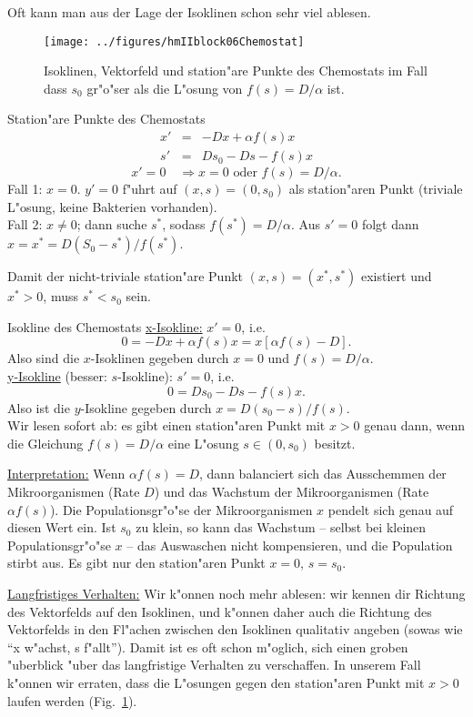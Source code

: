 Oft kann man aus der Lage der Isoklinen schon sehr viel ablesen. 

\begin{figure}[htb]
\begin{center}
\texttt{[image: ../figures/hmIIblock06Chemostat]}
\end{center}
\caption{Isoklinen, Vektorfeld und station"are Punkte 
des Chemostats im Fall dass 
$s_0$ gr"o"ser als die L"osung von $f(s)=D/\alpha$ ist.}
\label{chemostat}
\end{figure}
\begin{bspX} Station"are Punkte des Chemostats\\
\begin{eqnarray*}
x' & = & -Dx+\alpha f(s) x\\
s' & = & Ds_0 - Ds - f(s) x
\end{eqnarray*}
$$ x'=0\quad\Rightarrow x=0 \mbox{ oder } f(s)=D/\alpha.$$
Fall 1: $x=0$. $y'=0$ f"uhrt auf $(x,s)=(0,s_0)$ als station"aren Punkt (triviale L"osung, keine Bakterien vorhanden).\\
Fall 2: $x\not=0$; dann suche $s^*$, sodass $f(s^*)=D/\alpha$. Aus $s'=0$ 
folgt dann $x=x^*=D(S_0-s^*)/f(s^*).$\par
Damit der nicht-triviale station"are Punkt $(x,s)=(x^*,s^*)$ existiert 
und $x^*>0$, muss $s^*<s_0$ sein.\par
Isokline des Chemostats
\underline{x-Isokline:} $x'=0$, i.e.
$$ 0 = -Dx+\alpha f(s) x
= x[\alpha f(s)-D].$$
Also sind die $x$-Isoklinen gegeben durch $x=0$ und $f(s) = D/\alpha$.\\
\underline{y-Isokline} (besser: $s$-Isokline): $s'=0$, i.e.
$$ 0 = Ds_0 - Ds - f(s) x.$$
Also ist die $y$-Isokline gegeben durch $x = D(s_0-s)/f(s)$.\\
Wir lesen sofort ab: es gibt einen station"aren Punkt mit $x>0$ genau dann, wenn 
die Gleichung $f(s)=D/\alpha$ eine L"osung $s\in(0,s_0)$ besitzt.\par\medskip
\noindent
\underline{Interpretation:} Wenn $\alpha f(s)=D$, dann balanciert sich das 
Ausschemmen der Mikroorganismen (Rate $D$) und das Wachstum der Mikroorganismen 
(Rate $\alpha f(s)$). Die Populationsgr"o"se 
der Mikroorganismen $x$ pendelt sich 
genau auf diesen Wert ein. Ist $s_0$ zu klein, so kann das Wachstum -- selbst 
bei kleinen Populationsgr"o"se $x$ -- das Auswaschen nicht kompensieren, und die 
Population stirbt aus. Es gibt nur den station"aren Punkt $x=0$, $s=s_0$. 
\par\medskip
\noindent
\underline{Langfristiges Verhalten:} 
Wir k"onnen noch mehr ablesen: wir kennen dir Richtung des Vektorfelds auf den 
Isoklinen, und k"onnen daher auch die Richtung des Vektorfelds in den Fl"achen
zwischen den Isoklinen qualitativ angeben (sowas wie ``x w"achst, s f"allt''). 
Damit ist es oft schon m"oglich, sich einen groben "uberblick "uber das langfristige 
Verhalten zu verschaffen. In unserem Fall k"onnen
wir erraten, dass die L"osungen gegen den station"aren Punkt mit $x>0$ 
laufen werden (Fig.~\ref{chemostat}).
\end{bspX}

